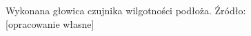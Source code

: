\begin{figure}[h]
	\centering
	\setlength{\fboxsep}{0pt}
	\setlength{\fboxrule}{1pt}
	\caption{Wykonana głowica czujnika wilgotności podłoża. Źródło: [opracowanie własne]} 
	\label{fig:czujnik wilg}
\end{figure}